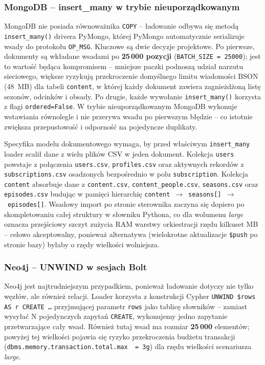 \subsubsection*{MongoDB -- insert\_many w trybie nieuporządkowanym}

MongoDB nie posiada równoważnika \texttt{COPY} -- ładowanie odbywa się
metodą \texttt{insert\_many()} drivera PyMongo, której PyMongo automatycznie
serializuje wsady do protokołu \texttt{OP\_MSG}. Kluczowe są dwie decyzje
projektowe. Po pierwsze, dokumenty są wkładane wsadami po
\textbf{25\,000 pozycji} (\texttt{BATCH\_SIZE = 25000}); jest to wartość
będąca kompromisem -- mniejsze paczki podnoszą udział narzutu sieciowego,
większe ryzykują przekroczenie domyślnego limitu wiadomości BSON
(48~MB) dla tabeli \texttt{content}, w której każdy dokument zawiera
zagnieżdżoną listę sezonów, odcinków i obsady. Po drugie, każde
wywołanie \texttt{insert\_many()} korzysta z flagi \texttt{ordered=False}.
W trybie nieuporządkowanym MongoDB wykonuje wstawiania równolegle
i nie przerywa wsadu po pierwszym błędzie -- co istotnie zwiększa
przepustowość i odporność na pojedyncze duplikaty.

Specyfika modelu dokumentowego wymaga, by przed właściwym \texttt{insert\_many}
loader scalił dane z wielu plików CSV w jeden dokument. Kolekcja
\texttt{users} powstaje z połączenia \texttt{users.csv}, \texttt{profiles.csv}
oraz aktywnych rekordów z \texttt{subscriptions.csv} osadzonych
bezpośrednio w polu \texttt{subscription}. Kolekcja \texttt{content}
absorbuje dane z \texttt{content.csv}, \texttt{content\_people.csv},
\texttt{seasons.csv} oraz \texttt{episodes.csv} budując w pamięci
hierarchię \texttt{content}~$\rightarrow$~\texttt{seasons[]}~$\rightarrow$~\texttt{episodes[]}.
Wsadowy import po stronie sterownika zaczyna się dopiero po skompletowaniu
całej struktury w słowniku Pythona, co dla wolumenu \emph{large} oznacza
przejściowy szczyt zużycia RAM warstwy orkiestracji rzędu kilkuset MB --
celowo akceptowalny, ponieważ alternatywa (wielokrotne aktualizacje
\texttt{\$push} po stronie bazy) byłaby o rzędy wielkości wolniejsza.

\subsubsection*{Neo4j -- UNWIND w sesjach Bolt}

Neo4j jest najtrudniejszym przypadkiem, ponieważ ładowanie dotyczy
nie tylko węzłów, ale również relacji. Loader korzysta z konstrukcji
Cypher \texttt{UNWIND \$rows AS r CREATE \dots} przyjmującej
parametr \texttt{rows} jako tablicę słowników -- zamiast wysyłać
N pojedynczych zapytań \texttt{CREATE}, wykonujemy jedno zapytanie
przetwarzające cały wsad. Również tutaj wsad ma rozmiar
\textbf{25\,000} elementów; powyżej tej wielkości pojawia się ryzyko
przekroczenia budżetu transakcji (\texttt{dbms.memory.transaction.total.max
~=~3g}) dla rzędu wielkości scenariusza \emph{large}.

